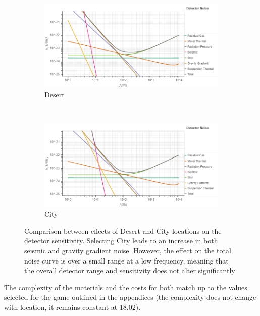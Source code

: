 \documentclass{article}
\begin{document}
    
    \begin{figure}[h!]
\centering
\begin{subfigure}{.8\textwidth}
        \centering
\includegraphics[width=1\linewidth, trim = {0 0 0 1cm}, clip]{aLIGODesert.png}
         \caption{Desert}
         \label{fig::PowerStages}
         \end{subfigure}%
         \\
        \begin{subfigure}{.8\textwidth}
        \centering
        \includegraphics[width=1\linewidth, trim = {0 0 0 0.9cm}, clip]{aLIGOCity.png}
\caption{City}
          \label{fig::aLIGODesertCity}
         \end{subfigure}
         \caption{Comparison between effects of Desert and City locations on the detector sensitivity. Selecting City leads to an increase in both seismic and gravity gradient noise. However, the effect on the total noise curve is over a small range at a low frequency, meaning that the overall detector range and sensitivity does not alter significantly}
         \label{fig::aLIGOSiliconCrystal}
 \end{figure}
 
 The complexity of the materials and the costs for both match up to the values selected for the game outlined in the appendices (the complexity does not change with location, it remains constant at 18.02). 
\end{document}
